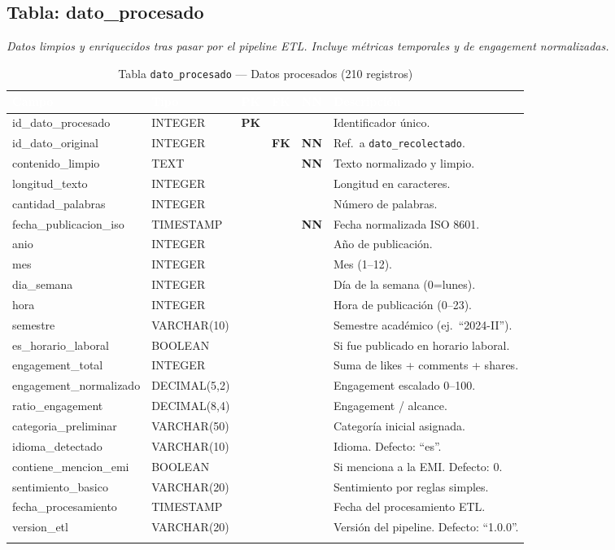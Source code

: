 \documentclass[11pt,a4paper]{article}
\newcommand{\tableheadrow}{\rowcolor{tableheader}}
\newcommand{\tablehead}[1]{\textcolor{white}{\textbf{#1}}}
\newcommand{\pk}{\textcolor{emiblue}{\textbf{PK}}}
\newcommand{\fk}{\textcolor{orange!80!black}{\textbf{FK}}}
\newcommand{\nn}{\textcolor{red!70!black}{\textbf{NN}}}
\begin{document}
\subsection{Tabla: dato\_procesado}
\textit{Datos limpios y enriquecidos tras pasar por el pipeline ETL. Incluye métricas temporales y de engagement normalizadas.}

\begin{longtable}{p{4.2cm} p{2.8cm} c c c p{4.5cm}}
\toprule
\tableheadrow
\tablehead{Campo} & \tablehead{Tipo} & \tablehead{PK} & \tablehead{FK} & \tablehead{NN} & \tablehead{Descripción} \\
\midrule
\endhead
id\_dato\_procesado & INTEGER & \pk & & & Identificador único. \\
\rowcolor{tablerow}
id\_dato\_original & INTEGER & & \fk & \nn & Ref.\ a \texttt{dato\_recolectado}. \\
contenido\_limpio & TEXT & & & \nn & Texto normalizado y limpio. \\
\rowcolor{tablerow}
longitud\_texto & INTEGER & & & & Longitud en caracteres. \\
cantidad\_palabras & INTEGER & & & & Número de palabras. \\
\rowcolor{tablerow}
fecha\_publicacion\_iso & TIMESTAMP & & & \nn & Fecha normalizada ISO 8601. \\
anio & INTEGER & & & & Año de publicación. \\
\rowcolor{tablerow}
mes & INTEGER & & & & Mes (1--12). \\
dia\_semana & INTEGER & & & & Día de la semana (0=lunes). \\
\rowcolor{tablerow}
hora & INTEGER & & & & Hora de publicación (0--23). \\
semestre & VARCHAR(10) & & & & Semestre académico (ej.\ ``2024-II''). \\
\rowcolor{tablerow}
es\_horario\_laboral & BOOLEAN & & & & Si fue publicado en horario laboral. \\
engagement\_total & INTEGER & & & & Suma de likes + comments + shares. \\
\rowcolor{tablerow}
engagement\_normalizado & DECIMAL(5,2) & & & & Engagement escalado 0--100. \\
ratio\_engagement & DECIMAL(8,4) & & & & Engagement / alcance. \\
\rowcolor{tablerow}
categoria\_preliminar & VARCHAR(50) & & & & Categoría inicial asignada. \\
idioma\_detectado & VARCHAR(10) & & & & Idioma. Defecto: ``es''. \\
\rowcolor{tablerow}
contiene\_mencion\_emi & BOOLEAN & & & & Si menciona a la EMI. Defecto: 0. \\
sentimiento\_basico & VARCHAR(20) & & & & Sentimiento por reglas simples. \\
\rowcolor{tablerow}
fecha\_procesamiento & TIMESTAMP & & & & Fecha del procesamiento ETL. \\
version\_etl & VARCHAR(20) & & & & Versión del pipeline. Defecto: ``1.0.0''. \\
\bottomrule
\caption{Tabla \texttt{dato\_procesado} — Datos procesados (210 registros)}
\end{longtable}
\end{document}

